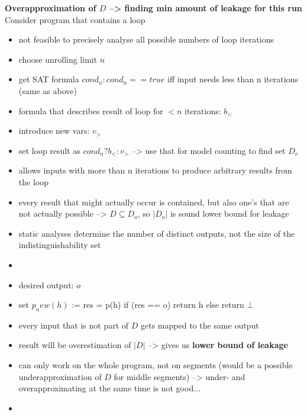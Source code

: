 \textbf{Overapproximation of $D$ --> finding min amount of leakage for this run}
Consider program that contains a loop
\begin{itemize}
    \item not feasible to precisely analyse all possible numbers of loop iterations
    \item choose unrolling limit $n$
    \item get SAT formula $cond_n: cond_n == true$ iff input needs less than n iterations (same as above)
    \item formula that describes result of loop for $< n$ iterations: $b_{<}$
    \item introduce new vars: $v_>$
    \item set loop result as $cond_n ? b_{<} : v_>$ --> use that for model counting to find set $D_o$
    \item allows inputs with more than n iterations to produce arbitrary results from the loop
    \item every result that might actually occur is contained, but also one's that are not actually possible --> $D \subseteq D_o$, so $|D_o|$ is sound lower bound for leakage
\end{itemize}


\begin{itemize}
    \item static analyses determine the number of distinct outputs, not the size of the indistinguishability set
    \item {}
    \item desired output: $o$
    \item set $p_new(h)$ := res = p(h) if (res == o) return h else return $\bot$
    \item every input that is not part of $D$ gets mapped to the same output
    \item result will be overestimation of $|D|$ --> gives us \textbf{lower bound of leakage}
    \item can only work on the whole program, not on segments (would be a possible underapproximation of $D$ for middle segments) --> under- and overapproximating at the same time is not good...
    \item {}
\end{itemize}

